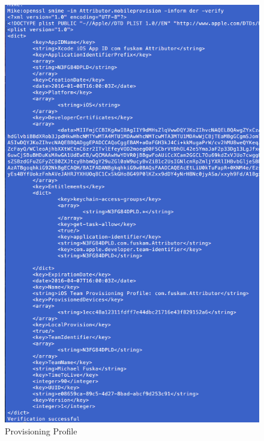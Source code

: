 \begin{figure}[!ht]
        \centering
                \includegraphics[scale=0.6]{SGML-Format}
        \caption{Provisioning Profile}
        \label{fig:ProvisioningProfile}
\end{figure}


